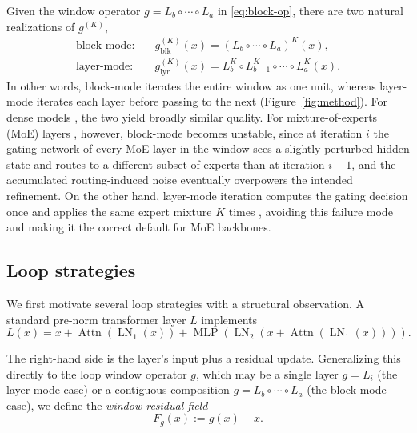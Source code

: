 Given the window operator $g = L_b \circ \cdots \circ L_a$ in \eqref{eq:block-op}, there are two natural realizations of $g^{(K)}$, \begin{align}
\text{block-mode:}\quad
   &g^{(K)}_{\operatorname{blk}}(x) = (L_b \circ \cdots \circ L_a)^{K}(x), \label{eq:block-mode}\\
\text{layer-mode:}\quad
   &g^{(K)}_{\operatorname{lyr}}(x) = L_b^{K} \circ L_{b-1}^{K} \circ \cdots \circ L_a^{K}(x).
     \label{eq:layer-mode}
\end{align}
In other words, block-mode iterates the entire window as one unit, whereas layer-mode iterates each layer before passing to the next (Figure~\ref{fig:method}). For dense models \citep{bae2024relaxed,bae2025mor}, the two yield broadly similar quality. For mixture-of-experts (MoE) layers \citep{deepseekv2,moonlight,csordas2024moeut}, however, block-mode becomes unstable, since at iteration $i$ the gating network of every MoE layer in the window sees a slightly perturbed hidden state and routes to a different subset of experts than at iteration $i-1$, and the accumulated routing-induced noise eventually overpowers the intended refinement. On the other hand, layer-mode iteration computes the gating decision once and applies the same expert mixture $K$ times \citep{csordas2024moeut}, avoiding this failure mode and making it the correct default for MoE backbones.

\subsection{Loop strategies}
\label{sec:strategy}

We first motivate several loop strategies with a structural observation. A standard pre-norm transformer layer $L$ \citep{vaswani2017attention} implements
\begin{equation}
L(x) = x + \operatorname{Attn}(\operatorname{LN}_1(x))+\operatorname{MLP}(\operatorname{LN}_2(x + \operatorname{Attn}(\operatorname{LN}_1(x)))).
\label{eq:block}
\end{equation}

The right-hand side is the layer's input plus a residual update. Generalizing this directly to the loop window operator $g$, which may be a single layer $g = L_i$ (the layer-mode case) or a contiguous composition $g = L_b \circ \cdots \circ L_a$ (the block-mode case), we define the \emph{window residual field}
\begin{equation}
F_g(x) := g(x) - x.
\label{eq:F}
\end{equation}

